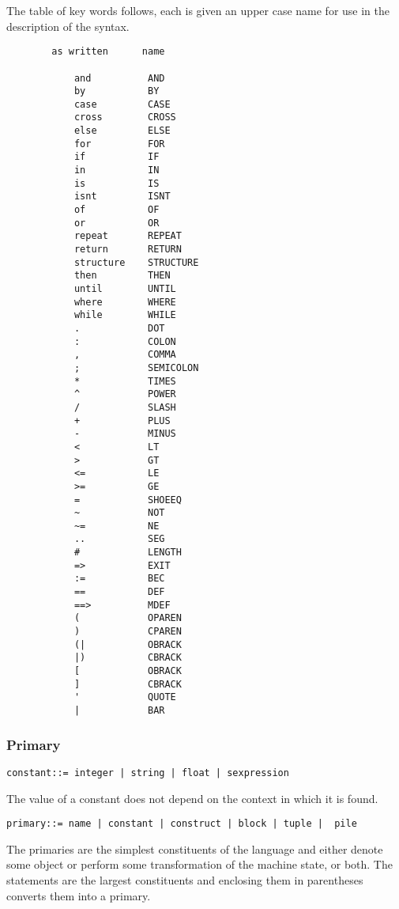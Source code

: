 \documentclass{article}
\begin{document}
The table of key words follows, each is given an upper case
name for use in the description of the syntax.
\begin{verbatim} 
        as written      name
 
            and          AND
            by           BY
            case         CASE
            cross        CROSS
            else         ELSE
            for          FOR
            if           IF
            in           IN
            is           IS
            isnt         ISNT
            of           OF
            or           OR
            repeat       REPEAT
            return       RETURN
            structure    STRUCTURE
            then         THEN
            until        UNTIL
            where        WHERE
            while        WHILE
            .            DOT
            :            COLON
            ,            COMMA
            ;            SEMICOLON
            *            TIMES
            ^            POWER
            /            SLASH
            +            PLUS
            -            MINUS
            <            LT
            >            GT
            <=           LE
            >=           GE
            =            SHOEEQ
            ~            NOT
            ~=           NE
            ..           SEG
            #            LENGTH
            =>           EXIT
            :=           BEC
            ==           DEF
            ==>          MDEF
            (            OPAREN
            )            CPAREN
            (|           OBRACK
            |)           CBRACK
            [            OBRACK
            ]            CBRACK
            '            QUOTE
            |            BAR
\end{verbatim}  
 
\subsubsection{Primary}
\label{sec:boot:primar-expr}

\begin{verbatim} 
constant::= integer | string | float | sexpression
\end{verbatim} 

The value of a constant does not depend on the context in which it
is found.
\begin{verbatim}  
primary::= name | constant | construct | block | tuple |  pile
\end{verbatim} 

The primaries are the simplest constituents of the language and
either denote some object or perform some transformation of the
machine state, or both.
The statements are the largest constituents and enclosing them
in parentheses converts them into a primary.
 
\end{document}

